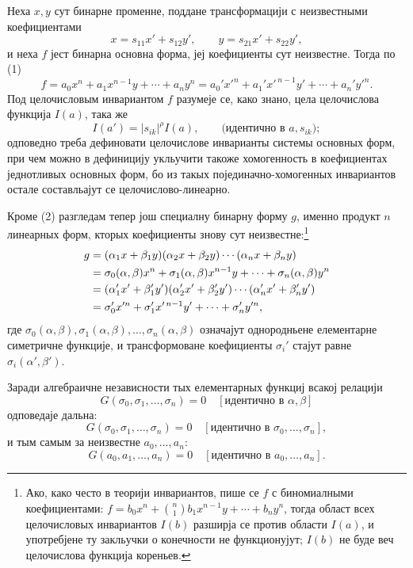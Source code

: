 ﻿\documentclass[11pt]{article}
\begin{document}
Неха \(x,y\) сут бинарне променне, поддане трансформацији с неизвестными коефициентами
\begin{equation}
        x=s_{11}x'+s_{12}y',\qquad y=s_{21}x'+s_{22}y',
\end{equation}
и неха \(f\) јест бинарна основна форма, јеј коефициенты сут неизвестне. Тогда по (1)
\begin{equation}
        f=a_0x^n+a_1x^{n-1}y+\cdots+a_ny^n
        =a_0'x'^n+a_1'x'^{\,n-1}y'+\cdots+a_n'y'^n.
\end{equation}
Под целочисловым инвариантом \(f\) разумеје се, како знано, цела целочислова функција \(I(a)\), така же
\begin{equation}
        I(a')=|s_{ik}|^\rho I(a),\qquad \text{(идентично в \(a,s_{ik}\))};
\end{equation}
одповедно треба дефиновати целочислове инварианты системы основных форм, при чем можно в дефиницију укльучити такоже хомогенность в коефициентах једнотливых основных форм, бо из такых појединачно-хомогенных инвариантов остале составльајут се целочислово-линеарно.

Кроме (2) разгледам тепер још специалну бинарну форму \(g\), именно продукт \(n\) линеарных форм, кторых коефициенты знову сут неизвестне:\footnote{Ако, како често в теорији инвариантов, пише се \(f\) с биномиалными коефициентами: \(f=b_0x^n+\binom n1b_1x^{n-1}y+\cdots+b_ny^n\), тогда област всех целочисловых инвариантов \(I(b)\) разширја се против области \(I(a)\), и употребјене ту закльучки о конечности не функционујут; \(I(b)\) не буде веч целочислова функција кореньев.}
\begin{align}
        g&=(\alpha_1x+\beta_1y)(\alpha_2x+\beta_2y)\cdots(\alpha_nx+\beta_ny)\notag\\
         &=\sigma_0(\alpha,\beta)x^n+\sigma_1(\alpha,\beta)x^{n-1}y+\cdots+\sigma_n(\alpha,\beta)y^n\notag\\
         &=(\alpha_1'x'+\beta_1'y')(\alpha_2'x'+\beta_2'y')\cdots(\alpha_n'x'+\beta_n'y')\notag\\
         &=\sigma_0'x'^n+\sigma_1'x'^{\,n-1}y'+\cdots+\sigma_n'y'^n,
\end{align}
где \(\sigma_0(\alpha,\beta),\sigma_1(\alpha,\beta),\ldots,\sigma_n(\alpha,\beta)\) означајут однородньене елементарне симетричне функције, и трансформоване коефициенты \(\sigma_i'\) стајут равне \(\sigma_i(\alpha',\beta')\).

Заради алгебраичне независности тых елементарных функциј всакој релацији
\begin{equation}
        G(\sigma_0,\sigma_1,\ldots,\sigma_n)=0
        \quad [\text{идентично в \(\alpha,\beta\)}]
\end{equation}
одповедаје дальна:
\begin{equation}
        G(\sigma_0,\sigma_1,\ldots,\sigma_n)=0
        \quad [\text{идентично в \(\sigma_0,\ldots,\sigma_n\)}],
\end{equation}
и тым самым за неизвестне \(a_0,\ldots,a_n\):
\begin{equation}
        G(a_0,a_1,\ldots,a_n)=0
        \quad [\text{идентично в \(a_0,\ldots,a_n\)}].
\end{equation}
\end{document}

